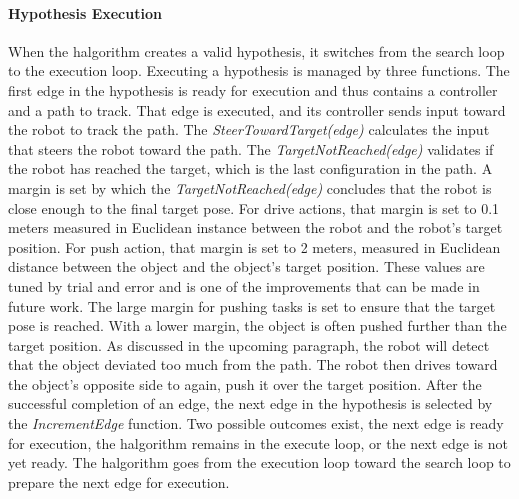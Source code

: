 \paragraph{Hypothesis Execution}
When the \ac{halgorithm} creates a valid hypothesis, it switches from the search loop to the execution loop. Executing a hypothesis is managed by three functions. The first edge in the hypothesis is ready for execution and thus contains a controller and a path to track. That edge is executed, and its controller sends input toward the robot to track the path. The \textit{SteerTowardTarget(\gls{edge})} calculates the input that steers the robot toward the path. The \textit{TargetNotReached(\gls{edge})} validates if the robot has reached the target, which is the last configuration in the path. A margin is set by which the \textit{TargetNotReached(\gls{edge})} concludes that the robot is close enough to the final target pose. For drive actions, that margin is set to 0.1 meters measured in Euclidean instance between the robot and the robot's target position.
For push action, that margin is set to 2 meters, measured in Euclidean distance between the object and the object's target position. These values are tuned by trial and error and is one of the improvements that can be made in future work. The large margin for pushing tasks is set to ensure that the target pose is reached. With a lower margin, the object is often pushed further than the target position. As discussed in the upcoming paragraph, the robot will detect that the object deviated too much from the path. The robot then drives toward the object's opposite side to again, push it over the target position. After the successful completion of an edge, the next edge in the hypothesis is selected by the \textit{IncrementEdge} function. Two possible outcomes exist, the next edge is ready for execution, the \ac{halgorithm} remains in the execute loop, or the next edge is not yet ready. The \ac{halgorithm} goes from the execution loop toward the search loop to prepare the next edge for execution.\bs




